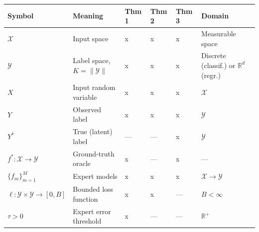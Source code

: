 \documentclass[
  12pt,
]{ctexart}
\begin{document}
\begin{longtable}[]{@{}
  >{\raggedright\arraybackslash}p{}
  >{\raggedright\arraybackslash}p{}
  >{\raggedright\arraybackslash}p{}
  >{\raggedright\arraybackslash}p{}
  >{\raggedright\arraybackslash}p{}
  >{\raggedright\arraybackslash}p{}@{}}
\toprule\noalign{}
\begin{minipage}[b]{\linewidth}\raggedright
Symbol
\end{minipage} & \begin{minipage}[b]{\linewidth}\raggedright
Meaning
\end{minipage} & \begin{minipage}[b]{\linewidth}\raggedright
Thm 1
\end{minipage} & \begin{minipage}[b]{\linewidth}\raggedright
Thm 2
\end{minipage} & \begin{minipage}[b]{\linewidth}\raggedright
Thm 3
\end{minipage} & \begin{minipage}[b]{\linewidth}\raggedright
Domain
\end{minipage} \\
\midrule\noalign{}
\endhead
\bottomrule\noalign{}
\endlastfoot
\(\mathcal{X}\) & Input space & x & x & x & Measurable space \\
\(\mathcal{Y}\) & Label space, \(K = \|\mathcal{Y}\|\) & x & x & x &
Discrete (classif.) or \(\mathbb{R}^d\) (regr.) \\
\(X\) & Input random variable & x & x & x & \(\mathcal{X}\) \\
\(Y\) & Observed label & x & x & x & \(\mathcal{Y}\) \\
\(Y^*\) & True (latent) label & --- & --- & x & \(\mathcal{Y}\) \\
\(f^* : \mathcal{X} \to \mathcal{Y}\) & Ground-truth oracle & x & --- &
x & --- \\
\(\{f_m\}_{m=1}^M\) & Expert models & x & x & x &
\(\mathcal{X} \to \mathcal{Y}\) \\
\(\ell : \mathcal{Y} \times \mathcal{Y} \to [0, B]\) & Bounded loss
function & x & x & --- & \(B < \infty\) \\
\(\tau > 0\) & Expert error threshold & x & --- & --- &
\(\mathbb{R}^+\) \\
\end{longtable}
\end{document}
